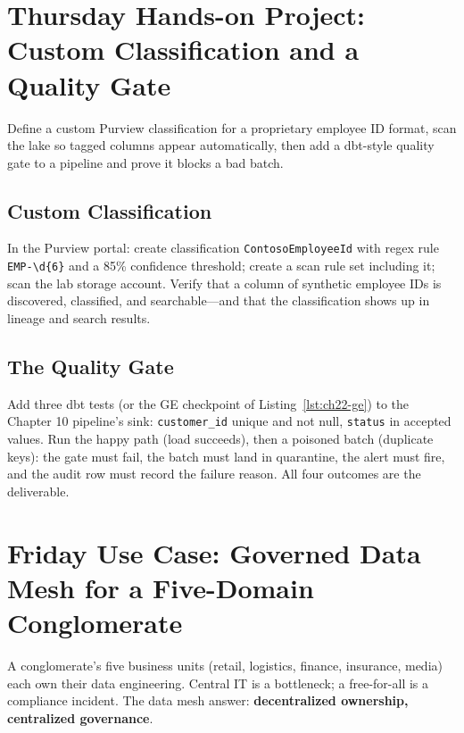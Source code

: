 \section{Thursday Hands-on Project: Custom Classification and a Quality Gate}
Define a custom Purview classification for a proprietary employee ID format, scan the lake so tagged columns appear automatically, then add a dbt-style quality gate to a pipeline and prove it blocks a bad batch.

\subsection{Custom Classification}
In the Purview portal: create classification \texttt{ContosoEmployeeId} with regex rule \texttt{EMP-\textbackslash d\{6\}} and a 85\% confidence threshold; create a scan rule set including it; scan the lab storage account. Verify that a column of synthetic employee IDs is discovered, classified, and searchable---and that the classification shows up in lineage and search results.

\subsection{The Quality Gate}
Add three dbt tests (or the GE checkpoint of Listing~\ref{lst:ch22-ge}) to the Chapter 10 pipeline's sink: \texttt{customer\_id} unique and not null, \texttt{status} in accepted values. Run the happy path (load succeeds), then a poisoned batch (duplicate keys): the gate must fail, the batch must land in quarantine, the alert must fire, and the audit row must record the failure reason. All four outcomes are the deliverable.

\section{Friday Use Case: Governed Data Mesh for a Five-Domain Conglomerate}
A conglomerate's five business units (retail, logistics, finance, insurance, media) each own their data engineering. Central IT is a bottleneck; a free-for-all is a compliance incident. The data mesh answer: \textbf{decentralized ownership, centralized governance}.

